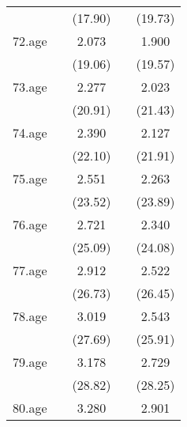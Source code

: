 {\begin{tabular}{l*{4}{c}}
            &                     &     (17.90)         &                     &     (19.73)         \\
[1em]
72.age      &                     &       2.073\sym{***}&                     &       1.900\sym{***}\\
            &                     &     (19.06)         &                     &     (19.57)         \\
[1em]
73.age      &                     &       2.277\sym{***}&                     &       2.023\sym{***}\\
            &                     &     (20.91)         &                     &     (21.43)         \\
[1em]
74.age      &                     &       2.390\sym{***}&                     &       2.127\sym{***}\\
            &                     &     (22.10)         &                     &     (21.91)         \\
[1em]
75.age      &                     &       2.551\sym{***}&                     &       2.263\sym{***}\\
            &                     &     (23.52)         &                     &     (23.89)         \\
[1em]
76.age      &                     &       2.721\sym{***}&                     &       2.340\sym{***}\\
            &                     &     (25.09)         &                     &     (24.08)         \\
[1em]
77.age      &                     &       2.912\sym{***}&                     &       2.522\sym{***}\\
            &                     &     (26.73)         &                     &     (26.45)         \\
[1em]
78.age      &                     &       3.019\sym{***}&                     &       2.543\sym{***}\\
            &                     &     (27.69)         &                     &     (25.91)         \\
[1em]
79.age      &                     &       3.178\sym{***}&                     &       2.729\sym{***}\\
            &                     &     (28.82)         &                     &     (28.25)         \\
[1em]
80.age      &                     &       3.280\sym{***}&                     &       2.901\sym{***}\\

\end{tabular}}
